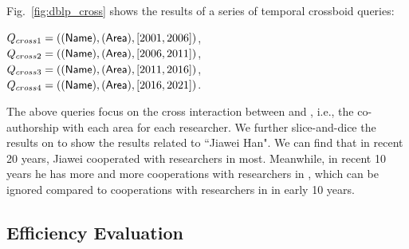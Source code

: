 \documentclass[10pt,journal,compsoc]{IEEEtran}
\begin{document}
Fig.~\ref{fig:dblp_cross} shows the results of a series of temporal crossboid queries:
\begin{center}
	$ Q_{cross1}=(({\mathsf{Name}}),({\mathsf{Area}}),[2001,2006]) $,\\$ Q_{cross2}=(({\mathsf{Name}}),({\mathsf{Area}}),[2006,2011]) $,\\$ Q_{cross3}=(({\mathsf{Name}}),({\mathsf{Area}}),[2011,2016]) $,\\$ Q_{cross4}=(({\mathsf{Name}}),({\mathsf{Area}}),[2016,2021]) $.
\end{center}
The above queries focus on the cross interaction between  and , i.e., the co-authorship with each area for each researcher. We further slice-and-dice the results on  to show the results related to ``Jiawei Han". We can find that in recent 20 years, Jiawei cooperated with researchers in  most. Meanwhile, in recent 10 years he has more and more cooperations with researchers in , which can be ignored compared to cooperations with researchers in  in early 10 years.

\subsection{Efficiency Evaluation} \label{subsec:efficiency_eva}
\end{document}
